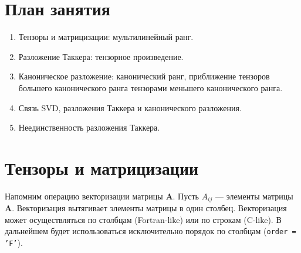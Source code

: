 \section{План занятия}
\label{sec:plan}
\begin{enumerate}
    \item Тензоры и матрицизации: мультилинейный ранг.
    \item Разложение Таккера: тензорное произведение.
    \item Каноническое разложение: канонический ранг, приближение тензоров большего канонического ранга тензорами меньшего канонического ранга.
    \item Связь SVD, разложения Таккера и канонического разложения.
    \item Неединственность разложения Таккера.
\end{enumerate}

\vspace{5mm}

\section{Тензоры и матрицизации}
\label{sec:tensors-and-matricization}

Напомним операцию векторизации матрицы $\bm{A}$. Пусть $A_{ij}$ — элементы матрицы $\bm{A}$. Векторизация вытягивает элементы матрицы в один столбец. Векторизация может осуществляться по столбцам (Fortran-like) или по строкам (C-like). В дальнейшем будет использоваться исключительно порядок по столбцам (\texttt{order = 'F'}).

